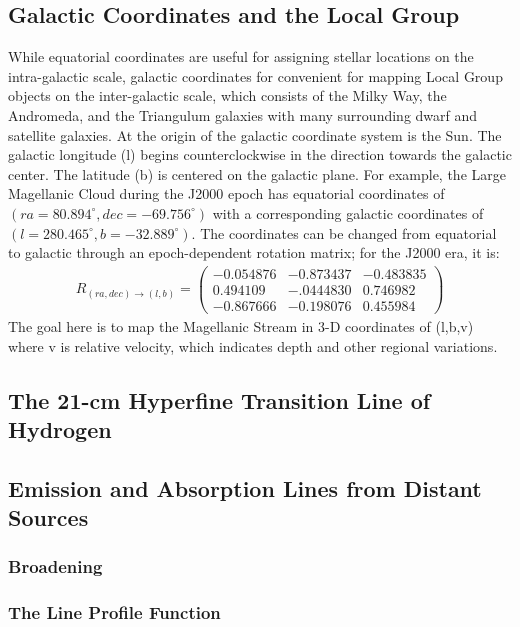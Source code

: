 \documentclass{article}
\begin{document}
\subsection{Galactic Coordinates and the Local Group}
While equatorial coordinates are useful for assigning stellar locations
on the intra-galactic scale, galactic coordinates for convenient for
mapping Local Group objects on the inter-galactic scale, which consists
of the Milky Way, the Andromeda, and the Triangulum galaxies with many
surrounding dwarf and satellite galaxies. At the origin of the galactic
coordinate system is the Sun. The galactic longitude (l) begins
counterclockwise in the direction towards the galactic center. The
latitude (b) is centered on the galactic plane. For example, the Large
Magellanic Cloud during the J2000 epoch has equatorial coordinates of
$(ra=80.894^{\circ} , dec=-69.756^{\circ})$ with a corresponding
galactic coordinates of $(l=280.465^{\circ} , b=-32.889^{\circ})$. The
coordinates can be changed from equatorial to galactic through an
epoch-dependent rotation matrix; for the J2000 era, it is:
\begin{align}R_{(ra,dec)\rightarrow(l,b)} = \begin{pmatrix}-0.054876 &
    -0.873437 & -0.483835 \\ 0.494109 & -.0444830 & 0.746982 \\
    -0.867666 & -0.198076 & 0.455984\end{pmatrix}
\end{align}
The goal here is to map the Magellanic Stream in 3-D coordinates of
(l,b,v) where v is relative velocity, which indicates depth and other
regional variations.
\subsection{The 21-cm Hyperfine Transition Line of Hydrogen}
\subsection{Emission and Absorption Lines from Distant Sources}
\subsubsection{Broadening}
\subsubsection{The Line Profile Function}
\end{document}
